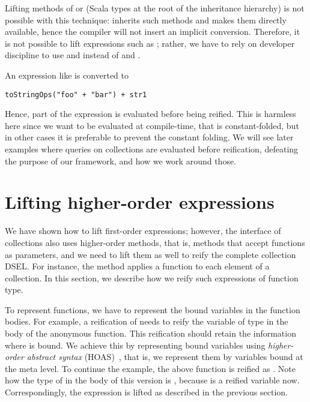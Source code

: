 Lifting methods of  or  (Scala types at the root of the inheritance hierarchy) is not possible with this technique:  inherits such methods and makes them directly available, hence the compiler will not insert an implicit conversion. Therefore, it is not possible to lift expressions such as ; rather, we have to rely on developer discipline to use \code{==\#} and \code{!=\#} instead of \code{==} and \code{!=}.

An expression like  is converted to
\begin{lstlisting}
toStringOps("foo" + "bar") + str1
\end{lstlisting}
Hence, part of the expression is evaluated before being reified. This is harmless here since we want  to be evaluated at compile-time, that is constant-folded, but in other cases it is preferable to prevent the constant folding. We will see later examples where queries on collections are evaluated before reification, defeating the purpose of our framework, and how we work around those.

\section{Lifting higher-order expressions}
\label{sec:lifting-ho}
We have shown how to lift first-order expressions; however, the interface of collections also uses higher-order methods, that is, methods that accept functions as parameters, and we need to lift them as well to reify the complete collection DSEL. For instance, the  method applies a function to each element of a collection. In this section, we describe how we reify such expressions of function type.

To represent functions, we have to represent the bound variables in the function bodies. For example, a reification of  needs to reify the variable  of type  in the body of the anonymous function. This reification should retain the information where  is bound. We achieve this by representing bound variables using \emph{higher-order abstract syntax} (HOAS)~\citep{Pfenning88hoas}, that is, we represent them by variables bound at the meta level. To continue the example, the above function is reified as . Note how the type of  in the body of this version is , because  is a reified variable now. Correspondingly, the expression  is lifted as described in the previous section. 

